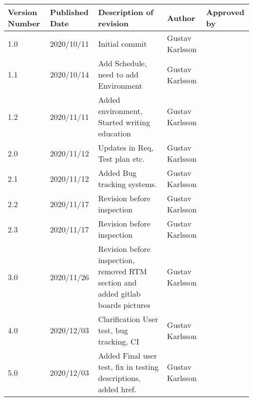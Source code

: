 \begin{tabular}{ |p{3cm}|p{3cm}|p{3cm}|p{3cm}|p{3cm}|  }
 

 \hline
 Version Number & Published Date & Description of revision & Author & Approved by \\
 \hline
 1.0   & 2020/10/11  & Initial commit & Gustav Karlsson &\\
 

 \hline
 1.1   & 2020/10/14   & Add Schedule, need to add Environment & Gustav Karlsson &\\
 
 \hline
 1.2   & 2020/11/11  & Added environment, Started writing education &Gustav Karlsson & \\
 
 \hline
 2.0   & 2020/11/12  & Updates in Req, Test plan etc. &Gustav Karlsson & \\
 
 \hline
 2.1   & 2020/11/12  & Added Bug tracking systems. &Gustav Karlsson & \\
  \hline
 2.2   & 2020/11/17  & Revision before inspection  &Gustav Karlsson &\\
 
 \hline
 2.3   & 2020/11/17  & Revision before inspection &Gustav Karlsson & \\
 
 \hline
  3.0   & 2020/11/26  & Revision before inspection, removed RTM section and added gitlab boards pictures &Gustav Karlsson & \\
 
 \hline
   4.0   & 2020/12/03  & Clarification User test, bug tracking, CI &Gustav Karlsson & \\
  \hline
   5.0   & 2020/12/03  & Added Final user test, fix in testing descriptions, added href. &Gustav Karlsson & \\
\hline
\end{tabular}